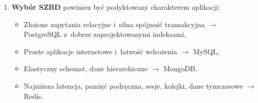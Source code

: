 \documentclass[12pt,a4paper]{article}
\begin{document}
\begin{enumerate}
    \item \textbf{Wybór SZBD} powinien być podyktowany charakterem aplikacji:
    \begin{itemize}[noitemsep]
        \item Złożone zapytania relacyjne i~silna spójność transakcyjna $\rightarrow$ PostgreSQL z~dobrze zaprojektowanymi indeksami,
        \item Proste aplikacje internetowe i~łatwość wdrożenia $\rightarrow$ MySQL,
        \item Elastyczny schemat, dane hierarchiczne $\rightarrow$ MongoDB,
        \item Najniższa latencja, pamięć podręczna, sesje, kolejki, dane tymczasowe $\rightarrow$ Redis.
    \end{itemize}
\end{enumerate}
\end{document}
